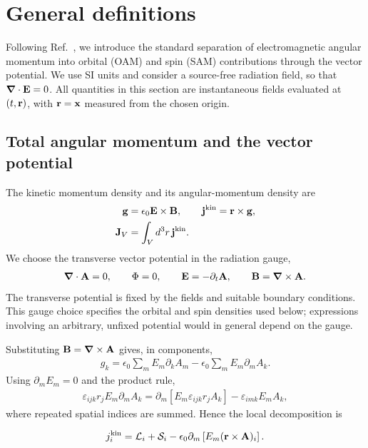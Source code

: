\section{General definitions}
\label{sec:am-vector-potential-split}

Following Ref.~\cite{bliokh_conservation_2014}, we introduce the standard
separation of electromagnetic angular momentum into orbital (OAM) and
spin (SAM) contributions through the vector potential.  We use SI units
and consider a source-free radiation field, so that
$\boldsymbol{\nabla}\cdot{\bf E}=0$.  All quantities in this section are
instantaneous fields evaluated at $(t,{\bf r})$, with ${\bf r}={\bf x}$
measured from the chosen origin.

\subsection{Total angular momentum and the vector potential}

The kinetic momentum density and its angular-momentum density are
\begin{align}
  {\bf g}&=\epsilon_0{\bf E}\times{\bf B},\qquad
  {\bf j}^{\mathrm{kin}}={\bf r}\times{\bf g},\\
  {\bf J}_V&=\int_V d^3r\,{\bf j}^{\mathrm{kin}}.
  \label{eq:am-general-total-integral}
\end{align}
We choose the transverse vector potential in the radiation gauge,
\begin{align}
  \boldsymbol{\nabla}\cdot{\bf A}=0,\qquad
  \Phi=0,\qquad
  {\bf E}=-\partial_t{\bf A},\qquad
  {\bf B}=\boldsymbol{\nabla}\times{\bf A}.
  \label{eq:am-general-radiation-gauge}
\end{align}
The transverse potential is fixed by the fields and suitable boundary
conditions.  This gauge choice specifies the orbital and spin densities
used below; expressions involving an arbitrary, unfixed potential would
in general depend on the gauge.

Substituting ${\bf B}=\boldsymbol{\nabla}\times{\bf A}$ gives, in components,
\begin{align}
  g_k=\epsilon_0\sum_m E_m\partial_k A_m
  -\epsilon_0\sum_m E_m\partial_m A_k.
  \label{eq:am-general-momentum-potential}
\end{align}
Using $\partial_m E_m=0$ and the product rule,
\begin{align}
  \varepsilon_{ijk}r_j E_m\partial_m A_k
  =\partial_m\left[E_m\varepsilon_{ijk}r_j A_k\right]
  -\varepsilon_{imk}E_m A_k,
\end{align}
where repeated spatial indices are summed.  Hence the local decomposition is
\begin{highlightbox}
  \begin{align}
    j_i^{\mathrm{kin}}
    =\mathcal L_i+\mathcal S_i
    -\epsilon_0\partial_m\left[E_m({\bf r}\times{\bf A})_i\right].
    \label{eq:am-general-local-split}
  \end{align}
\end{highlightbox}

